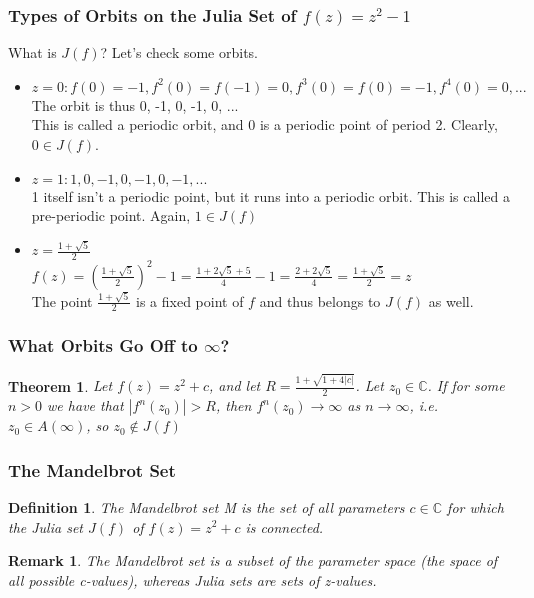 \documentclass{article}
\newtheorem{theorem}{Theorem}[section]
\newtheorem*{remark}{Remark}
\newtheorem{definition}{Definition}[section]
\begin{document}
\subsubsection{Types of Orbits on the Julia Set of $f(z) = z^2 - 1$}
What is $J(f)$? Let's check some orbits.
\begin{itemize}
\item $z = 0: f(0) = -1, f^2(0) = f(-1) = 0, f^3(0) = f(0) = -1, f^4(0) = 0,...$ \\
The orbit is thus 0, -1, 0, -1, 0, ... \\
This is called a periodic orbit, and 0 is a periodic point of period 2. Clearly, $0 \in J(f)$.
\item $z = 1: 1, 0, -1, 0, -1, 0, -1,...$ \\
1 itself isn't a periodic point, but it runs into a periodic orbit. This is called a pre-periodic point. Again, $1 \in J(f)$
\item $z = \frac{1 + \sqrt{5}}{2}$ \\
$f(z) = (\frac{1 + \sqrt{5}}{2})^2 - 1 = \frac{1 + 2\sqrt{5} + 5}{4} - 1 = \frac{2 + 2\sqrt{5}}{4} = \frac{1 + \sqrt{5}}{2} = z$ \\
The point $\frac{1 + \sqrt{5}}{2}$ is a fixed point of $f$ and thus belongs to $J(f)$ as well.
\end{itemize}

\subsubsection{What Orbits Go Off to $\infty$?}
\begin{theorem}
Let $f(z) = z^2 + c$, and let $R = \frac{1 + \sqrt{1 + 4\left|c\right|}}{2}$. Let $z_0 \in \mathbb{C}$. If for some $n > 0$ we have that $\left|f^n(z_0)\right| > R$, then $f^n(z_0) \to \infty$ as $n \to \infty$, i.e. $z_0 \in A(\infty)$, so $z_0 \notin J(f)$
\end{theorem}

\subsubsection{The Mandelbrot Set}
\begin{definition}
The Mandelbrot set M is the set of all parameters $c \in \mathbb{C}$ for which the Julia set $J(f)$ of $f(z) = z^2 +c$ is connected.
\end{definition}
\begin{remark}
The Mandelbrot set is a subset of the parameter space (the space of all possible c-values), whereas Julia sets are sets of z-values.
\end{remark}
\end{document}
